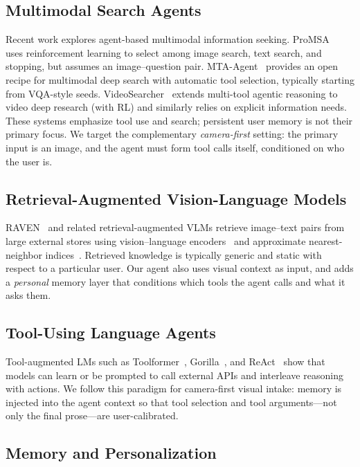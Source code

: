 \documentclass[11pt,a4paper]{article}
\begin{document}
\subsection{Multimodal Search Agents}

Recent work explores agent-based multimodal information seeking. ProMSA~\cite{promsa} uses reinforcement learning to select among image search, text search, and stopping, but assumes an image--question pair. MTA-Agent~\cite{mta_agent} provides an open recipe for multimodal deep search with automatic tool selection, typically starting from VQA-style seeds. VideoSearcher~\cite{videosearcher} extends multi-tool agentic reasoning to video deep research (with RL) and similarly relies on explicit information needs. These systems emphasize tool use and search; persistent user memory is not their primary focus. We target the complementary \emph{camera-first} setting: the primary input is an image, and the agent must form tool calls itself, conditioned on who the user is.

\subsection{Retrieval-Augmented Vision-Language Models}

RAVEN~\cite{raven} and related retrieval-augmented VLMs retrieve image--text pairs from large external stores using vision--language encoders~\cite{clip} and approximate nearest-neighbor indices~\cite{faiss}. Retrieved knowledge is typically generic and static with respect to a particular user. Our agent also uses visual context as input, and adds a \emph{personal} memory layer that conditions which tools the agent calls and what it asks them.

\subsection{Tool-Using Language Agents}

Tool-augmented LMs such as Toolformer~\cite{toolformer}, Gorilla~\cite{gorilla}, and ReAct~\cite{react} show that models can learn or be prompted to call external APIs and interleave reasoning with actions. We follow this paradigm for camera-first visual intake: memory is injected into the agent context so that tool selection and tool arguments---not only the final prose---are user-calibrated.

\subsection{Memory and Personalization}
\end{document}
